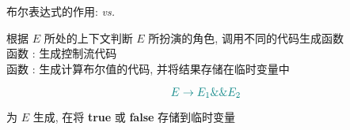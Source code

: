 
\begin{frame}{}
  \begin{center}
    {\Large 布尔表达式的作用:  \emph{vs.} }

    \vspace{0.50cm}

    \pause
    \vspace{0.50cm}
    根据 $E$ 所处的上下文判断 $E$ 所扮演的角色, 调用不同的代码生成函数 \\[15pt]

    函数 : 生成控制流代码 \\[6pt]
    函数 : 生成计算布尔值的代码, 并将结果存储在临时变量中
  \end{center}
\end{frame}

\begin{frame}{}
  \begin{center}

    \[
      \textcolor{teal}{E \to E_{1} \&\& E_{2}}
    \]

    为 $E$ 生成,
    在将 {\bf true} 或 {\bf false} 存储到临时变量
  \end{center}
\end{frame}
